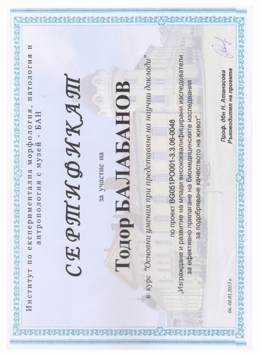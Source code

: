 \documentclass[bulgarian,a4paper]{europasscv}
\begin{document}
\includegraphics[width=\textwidth,height=\textheight,keepaspectratio]{IEMPAM2013_2}
\end{document}
